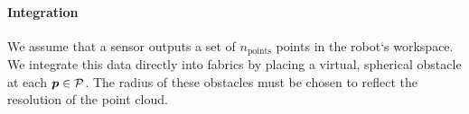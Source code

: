 \paragraph{Integration}
We assume that a sensor outputs a set of
$n_{\textrm{points}}$ points \pointcloud{} in the robot`s
workspace. We integrate this data directly into \ac{fabrics}
by placing a virtual, spherical obstacle at each $\bm{p} \in
\mathcal{P}$. The radius of these obstacles must be chosen
to reflect the resolution of the point cloud.
